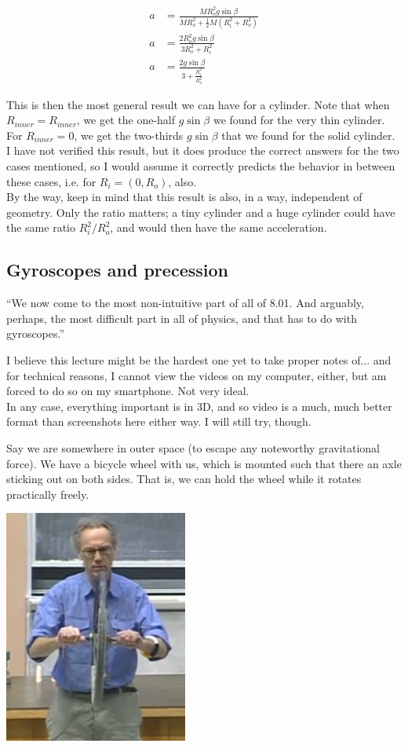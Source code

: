 \documentclass[8.01x]{subfiles}
\begin{document}
\begin{align}
a &= \frac{M R_o^2 g \sin \beta}{M R_o^2 + \frac{1}{2} M (R_i^2 + R_o^2)}\\
a &= \frac{2 R_o^2 g \sin \beta}{3 R_o^2 + R_i^2}\\
a &= \frac{2 g \sin \beta}{3 + \frac{R_i^2}{R_o^2}}
\end{align}

This is then the most general result we can have for a cylinder. Note that when $R_{inner} = R_{inner}$, we get the one-half $g \sin\beta$ we found for the very thin cylinder. For $R_{inner} = 0$, we get the two-thirds $g \sin \beta$ that we found for the solid cylinder. I have not verified this result, but it does produce the correct answers for the two cases mentioned, so I would assume it correctly predicts the behavior in between these cases, i.e. for $R_i = (0, R_o)$, also.\\
By the way, keep in mind that this result is also, in a way, independent of geometry. Only the ratio matters; a tiny cylinder and a huge cylinder could have the same ratio $R_i^2/R_o^2$, and would then have the same acceleration.

\subsection{Gyroscopes and precession}

``We now come to the most non-intuitive part of all of 8.01. And arguably, perhaps, the most difficult part in all of physics, and that has to do with gyroscopes.''

I believe this lecture might be the hardest one yet to take proper notes of... and for technical reasons, I cannot view the videos on my computer, either, but am forced to do so on my smartphone. Not very ideal.\\
In any case, everything important is in 3D, and so video is a much, much better format than screenshots here either way. I will still try, though.

Say we are somewhere in outer space (to escape any noteworthy gravitational force). We have a bicycle wheel with us, which is mounted such that there an axle sticking out on both sides. That is, we can hold the wheel while it rotates practically freely.

\begin{center}
\includegraphics[scale=0.75]{Graphics/lec24_bicycle_wheel}
\end{center}
\end{document}
